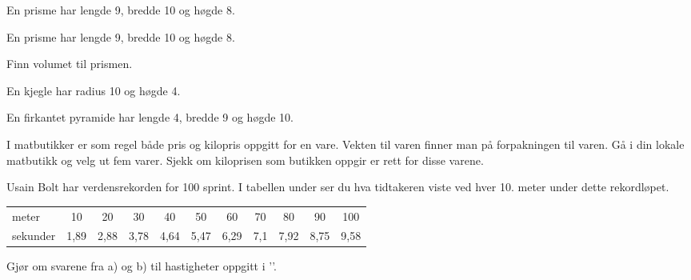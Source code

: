 \nes

En prisme har lengde 9, bredde 10 og høgde 8.

En prisme har lengde 9, bredde 10 og høgde 8.\os

Finn volumet til prismen.


En kjegle har radius 10 og høgde 4.

En firkantet pyramide har lengde 4, bredde 9 og høgde 10.

\nes

I matbutikker er som regel både pris og kilopris oppgitt for en vare. Vekten til varen finner man på forpakningen til varen. Gå i din lokale matbutikk og velg ut fem varer. Sjekk om kiloprisen som butikken oppgir er rett for disse varene.

Usain Bolt har verdensrekorden for 100 sprint. I tabellen under ser du hva tidtakeren viste ved hver 10. meter under dette rekordløpet. \vs
\begin{center}\small
	\begin{tabular}{l|c|c|c|c|c|c|c|c|c|c}
meter & 10 & 20 & 30 & 40 & 50 & 60 & 70 & 80 & 90 & 100\\
sekunder& 1,89 & 2,88 & 3,78 & 4,64 & 5,47 & 6,29 & 7,1 & 7,92 & 8,75 & 9,58
\end{tabular}
\end{center}

\nes
{}
Gjør om svarene fra  a) og b) til hastigheter oppgitt i ''. 



